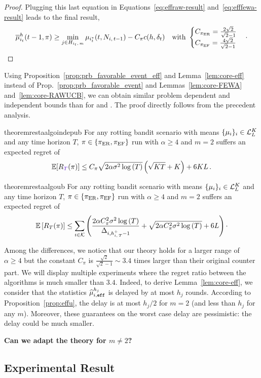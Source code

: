 \begin{proof}
Plugging this last equation in Equations~\ref{eq:effraw-result} and~\ref{eq:efffewa-result} leads to the final result,
\[
\overline{\mu}^{h}_{i_t}(t-1,\pi) \geq \min_{j \in H_{i_t,\,m}} \mu_{i^\star_t}(t,N_{i,\,t-1})- C_\pi c(h, \delta_t) \quad \text{with } 
\begin{cases}
C_{\normalfont \pi_{\rm ER}} = \frac{2\sqrt{2}}{\sqrt{2}-1}\\
C_{\normalfont \pi_{\rm EF}} = \frac{4\sqrt{2}}{\sqrt{2}-1}
\end{cases}\cdot
\]
\end{proof}

Using Proposition~\ref{prop:prb_favorable_event_eff} and Lemma~\ref{lem:core-eff} instead of Prop.~\ref{prop:prb_favorable_event} and Lemmas~\ref{lem:core-FEWA} and~\ref{lem:core-RAWUCB}, we can obtain similar problem dependent and independent bounds than for \FEWA and \RUCB. The proof directly follows from the precedent analysis. 
\begin{restatable}{theorem}{restaalgoindepub}
\label{th:rested-PI}
For any rotting bandit scenario with means $\{\mu_i\}_{i} \in \mathcal{L}_L^K$ and any time horizon $T$, $\pi \in \left\{\normalfont \pi_{\rm ER}, \normalfont \pi_{\rm EF} \right\}$ run with $\alpha \geq 4$ and $m=2$ suffers an expected regret of
\begin{equation*}
\mathbb{E}[\regret(\pi)] \leq C_\pi\sqrt{2\alpha\sigma^2\log\pa{T}}\pa{\sqrt{KT} +K} + 6KL\,.
\end{equation*}
\end{restatable}
\begin{restatable}{theorem}{restaalgoub}\label{th:rested-PD}
For any rotting bandit scenario with means $\{\mu_i\}_{i} \in \mathcal{L}_L^K$ and any time horizon $T$, $\pi \in \left\{\normalfont \pi_{\rm ER}, \normalfont \pi_{\rm EF} \right\}$ run with $\alpha \geq 4$ and $m=2$ suffers an expected regret of
\begin{align*}
\mathbb{E}\left[R_T(\pi)\right]  \leq \sum_{i\in \mathcal{K}} \left(\frac{2\alpha C_\pi^2\sigma^2\log\left(T\right)}{\Delta_{i,h_{i,\,T}^+-1}} + \sqrt{2\alpha C_\pi^2\sigma^2\log\left(T\right)} +6L \right) \cdot
\end{align*}
\end{restatable}

Among the differences, we notice that our theory holds for a larger range of $\alpha \geq 4$ but the constant $C_\pi$ is $\frac{\sqrt{2}}{\sqrt{2}-1} \sim 3.4$ times larger than their original counter part. We will display multiple experiments where the regret ratio between the algorithms is much smaller than $3.4$. Indeed, to derive Lemma~\ref{lem:core-eff}, we consider that the statistics $\widehat{\mu}_{i,\texttt{eff}}^{h_j}$ is delayed by at most $h_j$ rounds. According to Proposition~\ref{prop:effu}, the delay is at most $h_j/2$ for $m=2$ (and less than $h_j$ for any $m$). Moreover, these guarantees on the worst case delay are pessimistic: the delay could be much smaller. 

\begin{remark}
\textbf{Can we adapt the theory for $m\neq2$?} %
\end{remark}

\subsection{Experimental Result}





